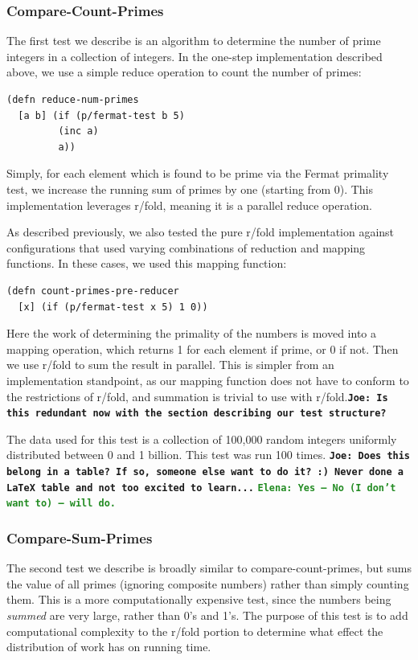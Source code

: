 \documentclass[12pt]{article}
\newcommand{\comment}[1]{{\bf \tt  {#1}}}
\newcommand{\emcomment}[1]{\textcolor{ForestGreen}{\comment{Elena: {#1}}}}
\newcommand{\joecomment}[1]{\textcolor{JoesGold}{\comment{Joe: {#1}}}}
\begin{document}
\subsubsection{Compare-Count-Primes}\label{sec:count-primes}
The first test we describe is an algorithm to determine the number of prime integers in a  collection of integers. In the one-step implementation described above, we use a simple reduce operation to count the number of primes:

\begin{verbatim}
(defn reduce-num-primes
  [a b] (if (p/fermat-test b 5)
         (inc a)
         a))
\end{verbatim}

Simply, for each element which is found to be prime via the Fermat primality test, we increase the running sum of primes by one (starting from 0). This implementation leverages r/fold, meaning it is a parallel reduce operation. 

As described previously, we also tested the pure r/fold implementation against configurations that used varying combinations of reduction and mapping functions. In these cases, we used this mapping function:

\begin{verbatim}
(defn count-primes-pre-reducer
  [x] (if (p/fermat-test x 5) 1 0))
\end{verbatim}

Here the work of determining the primality of the numbers is moved into a mapping operation, which returns 1 for each element if prime, or 0 if not. Then we use r/fold to sum the result in parallel. This is simpler from an implementation standpoint, as our mapping function does not have to conform to the restrictions of r/fold, and summation is trivial to use with r/fold.\joecomment{Is this redundant now with the section describing our test structure?}

The data used for this test is a collection of 100,000 random integers uniformly distributed between 0 and 1 billion. This test was run 100 times. \joecomment{Does this belong in a table? If so, someone else want to do it? :) Never done a LaTeX table and not too excited to learn...}
\emcomment{Yes -- No (I don't want to) -- will do.}

  
\subsubsection{Compare-Sum-Primes}\label{sec:sum-primes}
The second test we describe is broadly similar to compare-count-primes, but sums the value of all primes (ignoring composite numbers) rather than simply counting them. This is a more computationally expensive test, since the numbers being \emph{summed} are very large, rather than 0's and 1's. The purpose of this test is to add computational complexity to the r/fold portion to determine what effect the distribution of work has on running time.
\end{document}
